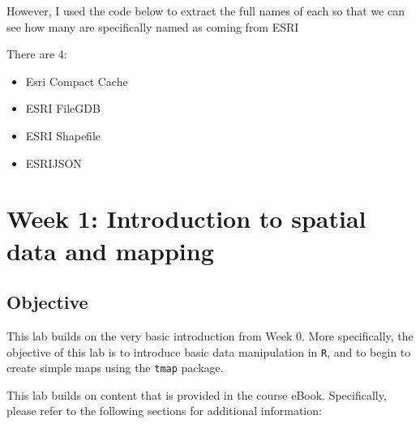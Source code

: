 \documentclass[
]{book}
\newenvironment{Shaded}{\begin{snugshade}}{\end{snugshade}}
\newcommand{\CommentTok}[1]{\textcolor[rgb]{0.56,0.35,0.01}{\textit{#1}}}
\newcommand{\FunctionTok}[1]{\textcolor[rgb]{0.00,0.00,0.00}{#1}}
\newcommand{\NormalTok}[1]{#1}
\newcommand{\OtherTok}[1]{\textcolor[rgb]{0.56,0.35,0.01}{#1}}
\newcommand{\SpecialCharTok}[1]{\textcolor[rgb]{0.00,0.00,0.00}{#1}}
\providecommand{\tightlist}{%
  \setlength{\itemsep}{0pt}\setlength{\parskip}{0pt}}
\begin{document}
However, I used the code below to extract the full names of each so that we can see how many are specifically named as coming from ESRI

\begin{Shaded}
\end{Shaded}

There are 4:

\begin{itemize}
\tightlist
\item
  Esri Compact Cache
\item
  ESRI FileGDB
\item
  ESRI Shapefile
\item
  ESRIJSON
\end{itemize}

\hypertarget{week-1-introduction-to-spatial-data-and-mapping}{%
\chapter{Week 1: Introduction to spatial data and mapping}\label{week-1-introduction-to-spatial-data-and-mapping}}

\hypertarget{objective}{%
\section{Objective}\label{objective}}

This lab builds on the very basic introduction from Week 0. More specifically, the objective of this lab is to introduce basic data manipulation in \texttt{R}, and to begin to create simple maps using the \texttt{tmap} package.

This lab builds on content that is provided in the course eBook. Specifically, please refer to the following sections for additional information:
\end{document}
